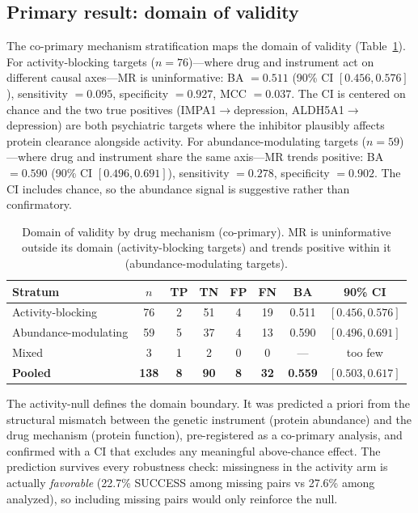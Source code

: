 \documentclass[11pt]{article}
\begin{document}
\subsection{Primary result: domain of validity}
\label{sec:boundary}

The co-primary mechanism stratification maps the domain of validity (Table~\ref{tab:mechanism}). For activity-blocking targets ($n = 76$)---where drug and instrument act on different causal axes---MR is uninformative: BA $= 0.511$ (90\% CI $[0.456, 0.576]$), sensitivity $= 0.095$, specificity $= 0.927$, MCC $= 0.037$. The CI is centered on chance and the two true positives (IMPA1$\rightarrow$depression, ALDH5A1$\rightarrow$depression) are both psychiatric targets where the inhibitor plausibly affects protein clearance alongside activity. For abundance-modulating targets ($n = 59$)---where drug and instrument share the same axis---MR trends positive: BA $= 0.590$ (90\% CI $[0.496, 0.691]$), sensitivity $= 0.278$, specificity $= 0.902$. The CI includes chance, so the abundance signal is suggestive rather than confirmatory.

\vspace{1em}
\begin{table}[t]
\centering
\caption{Domain of validity by drug mechanism (co-primary). MR is uninformative outside its domain (activity-blocking targets) and trends positive within it (abundance-modulating targets).}
\label{tab:mechanism}
\begin{tabular}{lccccccc}
\toprule
Stratum & $n$ & TP & TN & FP & FN & BA & 90\% CI \\
\midrule
Activity-blocking & 76 & 2 & 51 & 4 & 19 & 0.511 & $[0.456, 0.576]$ \\
Abundance-modulating & 59 & 5 & 37 & 4 & 13 & 0.590 & $[0.496, 0.691]$ \\
Mixed & 3 & 1 & 2 & 0 & 0 & --- & too few \\
\midrule
\textbf{Pooled} & \textbf{138} & \textbf{8} & \textbf{90} & \textbf{8} & \textbf{32} & \textbf{0.559} & $[0.503, 0.617]$ \\
\bottomrule
\end{tabular}
\end{table}

The activity-null defines the domain boundary. It was predicted a priori from the structural mismatch between the genetic instrument (protein abundance) and the drug mechanism (protein function), pre-registered as a co-primary analysis, and confirmed with a CI that excludes any meaningful above-chance effect. The prediction survives every robustness check: missingness in the activity arm is actually \emph{favorable} (22.7\% SUCCESS among missing pairs vs 27.6\% among analyzed), so including missing pairs would only reinforce the null.
\end{document}
